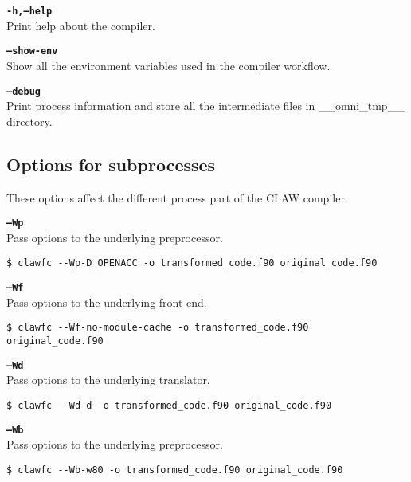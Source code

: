 \documentclass{article}
\begin{document}
\textbf{\texttt{-h,--help}}\\
Print help about the compiler. 

\textbf{\texttt{--show-env}}\\
Show all the environment variables used in the compiler workflow. 

\textbf{\texttt{--debug}}\\
Print process information and store all the intermediate files in \_\_omni\_tmp\_\_ directory. 

\subsection{Options for subprocesses}
These options affect the different process part of the CLAW compiler. 

\textbf{\texttt{--Wp}}\\
Pass options to the underlying preprocessor. 
\begin{lstlisting}
$ clawfc --Wp-D_OPENACC -o transformed_code.f90 original_code.f90
\end{lstlisting}

\textbf{\texttt{--Wf}}\\
Pass options to the underlying front-end. 
\begin{lstlisting}
$ clawfc --Wf-no-module-cache -o transformed_code.f90 original_code.f90
\end{lstlisting}

\textbf{\texttt{--Wd}}\\
Pass options to the underlying translator. 
\begin{lstlisting}
$ clawfc --Wd-d -o transformed_code.f90 original_code.f90
\end{lstlisting}

\textbf{\texttt{--Wb}}\\
Pass options to the underlying preprocessor. 
\begin{lstlisting}
$ clawfc --Wb-w80 -o transformed_code.f90 original_code.f90
\end{lstlisting}
\end{document}
